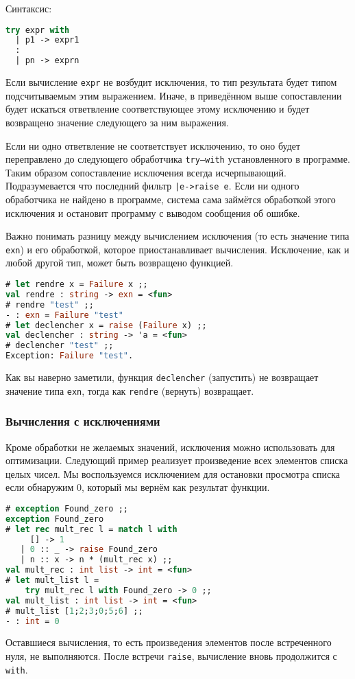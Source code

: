 Синтаксис:

\begin{lstlisting}[language=OCaml]
try expr with
  | p1 -> expr1
  :
  | pn -> exprn
\end{lstlisting}

Если вычисление \texttt{expr} не возбудит исключения, то тип результата будет
типом подсчитываемым этим выражением. Иначе, в приведённом выше сопоставлении
будет искаться ответвление соответствующее этому исключению и будет возвращено
значение следующего за ним выражения.

Если ни одно ответвление не соответствует исключению, то оно будет переправлено
до следующего обработчика \texttt{try--with} установленного в программе. Таким
образом сопоставление исключения всегда исчерпывающий. Подразумевается что
последний фильтр \texttt{|e->raise e}. Если ни одного обработчика не найдено в
программе, система сама займётся обработкой этого исключения и остановит
программу с выводом сообщения об ошибке.

Важно понимать разницу между вычислением исключения (то есть значение типа
\texttt{exn}) и его обработкой, которое приостанавливает вычисления. Исключение,
как и любой другой тип, может быть возвращено функцией.

\begin{lstlisting}[language=OCaml]
# let rendre x = Failure x ;;
val rendre : string -> exn = <fun>
# rendre "test" ;;
- : exn = Failure "test"
# let declencher x = raise (Failure x) ;;
val declencher : string -> 'a = <fun>
# declencher "test" ;;
Exception: Failure "test".
\end{lstlisting}

Как вы наверно заметили, функция \texttt{declencher} (запустить) не возвращает
значение типа \texttt{exn}, тогда как \texttt{rendre} (вернуть) возвращает.

\subsubsection{Вычисления с исключениями}

Кроме обработки не желаемых значений, исключения можно использовать для
оптимизации. Следующий пример реализует произведение всех элементов списка целых
чисел. Мы воспользуемся исключением для остановки просмотра списка если
обнаружим 0, который мы вернём как результат функции.

\begin{lstlisting}[language=OCaml]
# exception Found_zero ;;
exception Found_zero
# let rec mult_rec l = match l with
     [] -> 1
   | 0 :: _ -> raise Found_zero
   | n :: x -> n * (mult_rec x) ;;
val mult_rec : int list -> int = <fun>
# let mult_list l =
    try mult_rec l with Found_zero -> 0 ;;
val mult_list : int list -> int = <fun>
# mult_list [1;2;3;0;5;6] ;;
- : int = 0
\end{lstlisting}

Оставшиеся вычисления, то есть произведения элементов после встреченного нуля,
не выполняются. После встречи \texttt{raise}, вычисление вновь продолжится с
\texttt{with}.




